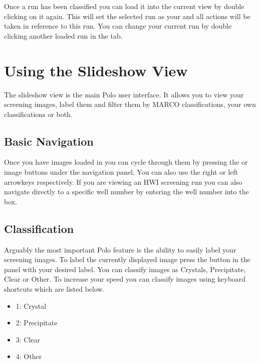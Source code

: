 \documentclass[letterpaper,10pt,english]{sphinxmanual}
\begin{document}
Once a run has been classified you can load it into the current view
by double clicking on it again. This will set the selected run as your
 and all actions will be taken in reference to this run.
You can change your current run by double clicking another loaded run in the
 tab.
\begin{quote}

\noindent{}
\end{quote}


\section{Using the Slideshow View}
\label{\detokenize{user_guide:using-the-slideshow-view}}
The slideshow view is the main Polo user interface. It allows you to view
your screening images, label them and filter them by MARCO classifications,
your own classifications or both.
\begin{quote}

\noindent{}
\end{quote}


\subsection{Basic Navigation}
\label{\detokenize{user_guide:basic-navigation}}
Once you have images loaded in you can cycle through them by
pressing the  or  image buttons under the navigation
panel. You can also use the right or left arrowkeys respectively. If you are
viewing an HWI screening run you can also navigate directly to a specific
well number by entering the well number into the  box.


\subsection{Classification}
\label{\detokenize{user_guide:classification}}
Arguably the most important Polo feature is the ability to easily
label your screening images. To label the currently displayed image
press the button in the  panel with your desired label.
You can classify images as Crystals, Precipitate, Clear or Other. To increase
your speed you can classify images using keyboard shortcuts which are
listed below.
\begin{itemize}
\item {} 
1: Crystal

\item {} 
2: Precipitate

\item {} 
3: Clear

\item {} 
4: Other

\end{itemize}
\end{document}
